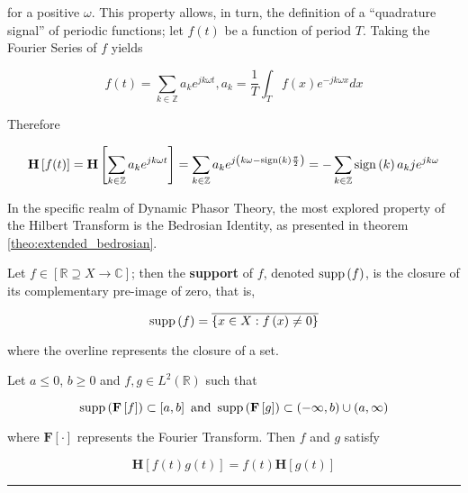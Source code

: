 	\noindent for a positive $\omega$. This property allows, in turn, the definition of a ``quadrature signal'' of periodic functions; let $f(t)$ be a function of period $T$. Taking the Fourier Series of $f$ yields

\begin{equation} f(t) = \sum_{k\in\mathbb{Z}} a_k e^{jk\omega t}, a_k = \dfrac{1}{T} \int_{T} f(x)e^{-jk\omega x}{dx}\end{equation}

	Therefore

\begin{equation}  \mathbf{H}\left[ f(t) \right] = \mathbf{H}\left[ \sum_{k\in\mathbb{Z}} a_k e^{jk\omega t}\right] = \sum_{k\in\mathbb{Z}} a_k e^{j\left(k\omega - \operatorname{sign}\left(k\right)\frac{\pi}{2}\right)} = -\sum_{k\in\mathbb{Z}}\operatorname{sign}\left(k\right) a_k j e^{jk\omega} \end{equation}

	In the specific realm of Dynamic Phasor Theory, the most explored property of the Hilbert Transform is the Bedrosian Identity, as presented in theorem \ref{theo:extended_bedrosian}.

\begin{definition}
	Let $f\in\left[\mathbb{R}\supseteq X\to \mathbb{C}\right]$; then the \textbf{support} of $f$, denoted $\operatorname{supp}\left(f\right)$, is the closure of its complementary pre-image of zero, that is,

\begin{equation} \operatorname{supp}\left(f\right) = \overline{\left\{x\in X: f\left(x\right)\neq 0\right\}} \end{equation}

	\noindent where the overline represents the closure of a set.

\end{definition}
\begin{theorem}\label{theo:extended_bedrosian} %
	Let $a\leq 0$, $b \geq 0$ and $f,g\in L^2\left(\mathbb{R}\right)$ such that

\begin{equation} \operatorname{supp}\left(\mathbf{F}\left[f\right]\right)\subset \left[a,b\right] \text{ and } \operatorname{supp}\left(\mathbf{F}\left[g\right]\right)\subset \left(-\infty,b\right)\cup \left(a,\infty\right) \label{eq:bedrosian_condition}\end{equation}

	\noindent where $\mathbf{F}\left[\cdot\right]$ represents the Fourier Transform. Then $f$ and $g$ satisfy

\begin{equation} \mathbf{H}\left[f(t)g(t)\right] = f(t)\mathbf{H}\left[g(t)\right] \end{equation}
\end{theorem}
\hrule
\vspace{5mm}

